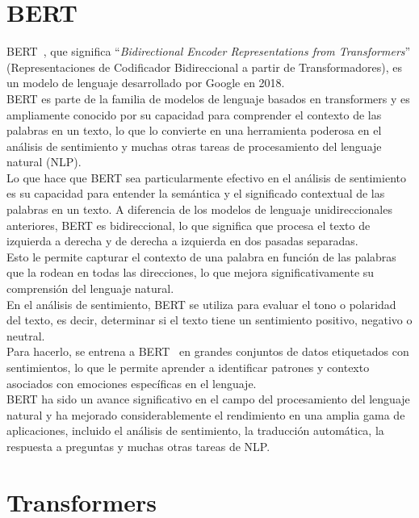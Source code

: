 
\section{BERT}

BERT~\cite{devlin2019bert}, que significa ``\emph{Bidirectional Encoder Representations from Transformers}''
(Representaciones de Codificador Bidireccional a partir de Transformadores),
es un modelo de lenguaje desarrollado por Google en 2018.\\
BERT es parte de la familia de modelos de lenguaje basados en transformers
y es ampliamente conocido por su capacidad para comprender el contexto
de las palabras en un texto, lo que lo convierte en una herramienta
poderosa en el análisis de sentimiento y muchas otras tareas de procesamiento
del lenguaje natural (NLP).\\
Lo que hace que BERT sea particularmente efectivo en el análisis de sentimiento
es su capacidad para entender la semántica y el significado contextual de las palabras en un texto.
A diferencia de los modelos de lenguaje unidireccionales anteriores,
BERT es bidireccional, lo que significa que procesa el texto de izquierda a derecha y
de derecha a izquierda en dos pasadas separadas.\\
Esto le permite capturar el contexto de una palabra en función de las
palabras que la rodean en todas las direcciones, lo que mejora significativamente
su comprensión del lenguaje natural.\\
En el análisis de sentimiento, BERT se utiliza para evaluar el tono
o polaridad del texto, es decir, determinar si el texto tiene un sentimiento positivo,
negativo o neutral.\\ 
Para hacerlo, se entrena a BERT~\cite{BertSentimentModel1}
en grandes conjuntos de datos etiquetados con sentimientos, lo que le permite aprender
a identificar patrones y contexto asociados con emociones específicas en el lenguaje.\\
BERT ha sido un avance significativo en el campo del procesamiento
del lenguaje natural y ha mejorado considerablemente el rendimiento
en una amplia gama de aplicaciones, incluido el análisis de sentimiento,
la traducción automática, la respuesta a preguntas y muchas otras tareas de NLP.

\section{Transformers}

